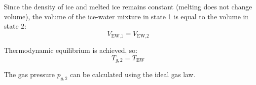 Since the density of ice and melted ice remains constant (melting does not change volume), the volume of the ice-water mixture in state 1 is equal to the volume in state 2:  
\[
V_{\text{EW,1}} = V_{\text{EW,2}}
\]  

Thermodynamic equilibrium is achieved, so:  
\[
T_{g,2} = T_{\text{EW}}
\]  

The gas pressure \( p_{g,2} \) can be calculated using the ideal gas law.